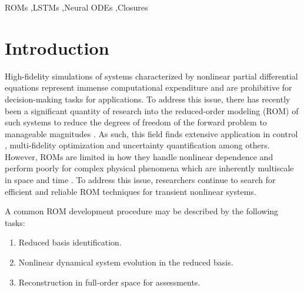 \documentclass[preprint,12pt]{elsarticle}
\begin{document}
\begin{frontmatter}
\begin{keyword}
ROMs \sep LSTMs \sep Neural ODEs \sep Closures 
\end{keyword}

\end{frontmatter}


\section{Introduction}
\label{Intro}

High-fidelity simulations of systems characterized by nonlinear partial differential equations represent immense computational expenditure and are prohibitive for decision-making tasks for applications. To address this issue, there has recently been a significant quantity of research into the reduced-order modeling (ROM) of such systems to reduce the degrees of freedom of the forward problem to manageable magnitudes \cite{carlberg2011efficient,wang2012proper,san2015principal,ballarin2015supremizer,san2018extreme,wang2019non,choi2019space}. As such, this field finds extensive application in control \cite{proctor2016dynamic}, multi-fidelity optimization \cite{peherstorfer2016optimal} and uncertainty quantification \cite{sapsis2013statistically,zahr2018efficient} among others. However, ROMs are limited in how they handle nonlinear dependence and perform poorly for complex physical phenomena which are inherently multiscale in space and time \cite{wells2017evolve,xie2018data,san2018neural,san2019artificial}. To address this issue, researchers continue to search for efficient and reliable ROM techniques for transient nonlinear systems. 

A common ROM development procedure may be described by the following tasks:
\begin{enumerate}
    \item Reduced basis identification.
    \item Nonlinear dynamical system evolution in the reduced basis.
    \item Reconstruction in full-order space for assessments.
\end{enumerate}
\end{document}
